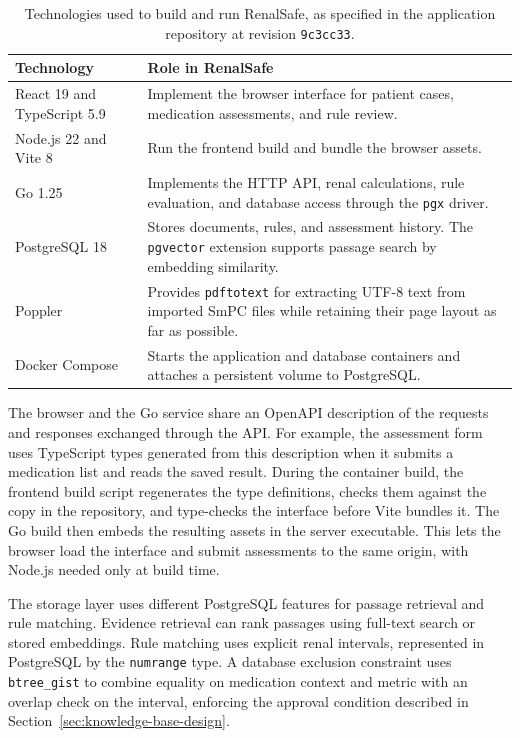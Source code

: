 \documentclass[12pt,a4paper,twoside]{book}
\begin{document}
\begin{table}[htbp]
    \centering
    \caption[RenalSafe technology stack]{Technologies used to build and run RenalSafe, as specified in the application repository at revision \texttt{9c3cc33}.}
    \label{tab:technology-stack}
    \begin{tabularx}{\linewidth}{@{}l >{\raggedright\arraybackslash}X@{}}
        \toprule
        \textbf{Technology} & \textbf{Role in RenalSafe} \\
        \midrule
        React 19 and TypeScript 5.9 & Implement the browser interface for patient cases, medication assessments, and rule review. \\
        Node.js 22 and Vite 8 & Run the frontend build and bundle the browser assets. \\
        Go 1.25 & Implements the HTTP API, renal calculations, rule evaluation, and database access through the \texttt{pgx} driver. \\
        PostgreSQL 18 & Stores documents, rules, and assessment history. The \texttt{pgvector} extension supports passage search by embedding similarity. \\
        Poppler & Provides \texttt{pdftotext} for extracting UTF-8 text from imported SmPC files while retaining their page layout as far as possible. \\
        Docker Compose & Starts the application and database containers and attaches a persistent volume to PostgreSQL. \\
        \bottomrule
    \end{tabularx}
\end{table}

The browser and the Go service share an OpenAPI description of the requests and responses exchanged through the API.
For example, the assessment form uses TypeScript types generated from this description when it submits a medication list and reads the saved result.
During the container build, the frontend build script regenerates the type definitions, checks them against the copy in the repository, and type-checks the interface before Vite bundles it.
The Go build then embeds the resulting assets in the server executable.
This lets the browser load the interface and submit assessments to the same origin, with Node.js needed only at build time.

The storage layer uses different PostgreSQL features for passage retrieval and rule matching.
Evidence retrieval can rank passages using full-text search or stored embeddings.
Rule matching uses explicit renal intervals, represented in PostgreSQL by the \texttt{numrange} type.
A database exclusion constraint uses \texttt{btree\_gist} to combine equality on medication context and metric with an overlap check on the interval, enforcing the approval condition described in Section~\ref{sec:knowledge-base-design}.
\end{document}
